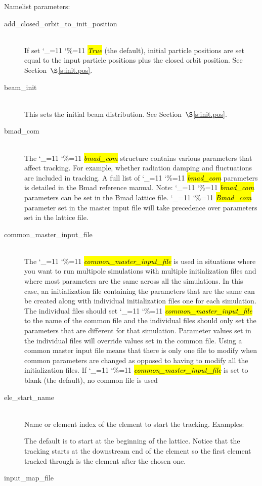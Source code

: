 \documentclass{hitec}
\newcommand\dottcmd[1]{\hl{\em#1}\endgroup}
\newcommand{\vn}{\begingroup\catcode`\_=11 \catcode`\%=11 \dottcmd}
\newcommand{\Newline}{\hfil \\}
\newcommand{\sref}[1]{$\S$\ref{#1}}
\begin{document}
{{Namelist parameters:
\begin{description}
\item[add_closed_orbit_to_init_position] \Newline
If set \vn{True} (the default), initial particle positions are set equal to the input particle positions
plus the closed orbit position. See Section~\sref{s:init.pos}.
%
\item[beam_init] \Newline
This sets the initial beam distribution. See Section~\sref{s:init.pos}.
%
\item[bmad_com] \Newline
The \vn{bmad_com} structure contains various parameters that affect tracking. For example, whether
radiation damping and fluctuations are included in tracking. A full list of \vn{bmad_com} parameters
is detailed in the Bmad reference manual. Note: \vn{bmad_com} parameters can be set in the Bmad
lattice file. \vn{Bmad_com} parameter set in the master input file will take precedence over
parameters set in the lattice file.
%
\item[common_master_input_file] \Newline
The \vn{common_master_input_file} is used in situations where you want to run multipole simulations
with multiple initialization files and where most parameters are the same across all the
simulations. In this case, an initialization file containing the parameters that are the same can be
created along with individual initialization files one for each simulation. The individual files
should set \vn{common_master_input_file} to the name of the common file and the individual files
should only set the parameters that are different for that simulation. Parameter values set in the
individual files will override values set in the common file. Using a common master input file means
that there is only one file to modify when common parameters are changed as opposed to having to
modify all the initialization files. If \vn{common_master_input_file} is set to blank (the default),
no common file is used
%
\item[ele_start_name] \Newline
Name or element index of the element to start the tracking. Examples:
The default is to start at the beginning of the lattice. Notice that the tracking starts at the
downstream end of the element so the first element tracked through is the element after the chosen
one.
%
\item[input_map_file] \Newline

\end{description}}}
\end{document}
